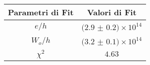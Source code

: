 \begin{tabular}{cc}
\hline
	Parametri di Fit & Valori di Fit\\ 
\hline
	$e/h$ & $(2.9$ $\pm$ $0.2)\times 10^{14}$ \\
	$W_o/h$ & $(3.2$ $\pm$ $0.1)\times 10^{14}$ \\
	$\chi^2$ & $4.63$ \\
\hline
\end{tabular}
